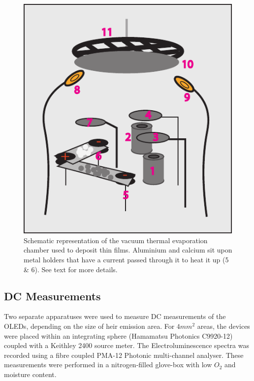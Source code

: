 \documentclass[
  letterpaper,
  DIV=11,
  numbers=noendperiod,
  oneside]{scrreprt}
\begin{document}
\begin{figure}

{\centering \includegraphics{./images/ThermalEvap.pdf}

}

\caption{\label{fig-evap}Schematic representation of the vacuum thermal
evaporation chamber used to deposit thin films. Aluminium and calcium
sit upon metal holders that have a current passed through it to heat it
up (5 \& 6). See text for more details.}

\end{figure}

\hypertarget{dc-measurements-1}{%
\subsection{DC Measurements}\label{dc-measurements-1}}

Two separate apparatuses were used to measure DC measurements of the
OLEDs, depending on the size of heir emission area. For \(4mm^2\) areas,
the devices were placed within an integrating sphere (Hamamatsu
Photonics C9920-12) coupled with a Keithley 2400 source meter. The
Electroluminescence spectra was recorded using a fibre coupled PMA-12
Photonic multi-channel analyser. These measurements were performed in a
nitrogen-filled glove-box with low \(O_2\) and moisture content.
\end{document}
